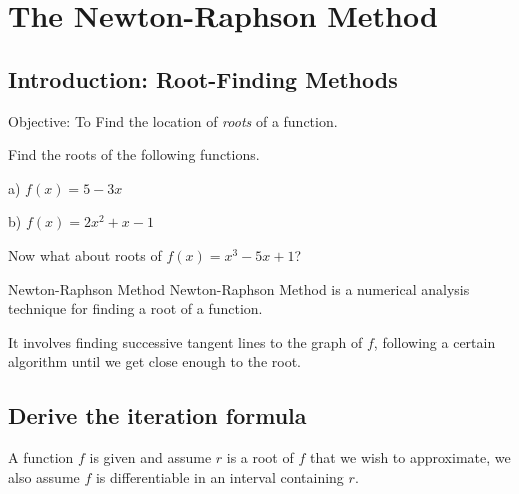 \chapter{The Newton-Raphson Method}
\section{Introduction: Root-Finding Methods}

Objective: To Find the location of \emph{roots} of a function.


\begin{examplebox}{Find the roots of the following functions.}

a) $f(x) = 5-3x$

\vspace{1cm}

b) $f(x) = 2x^2 +x -1$

\vspace{1cm}

\end{examplebox}

Now what about roots of $f(x) = x^3 -5x +1$?


\begin{mybox}{Newton-Raphson Method}
Newton-Raphson Method is a numerical analysis technique for finding a root of a function.

It involves finding successive tangent lines to the graph of $f$, following a certain algorithm until we get close enough to the root.
\end{mybox}


\section{Derive the iteration formula}

A function $f$ is given and assume $r$ is a root of $f$ that we wish to approximate, we also assume $f$ is differentiable in an interval containing $r$.

